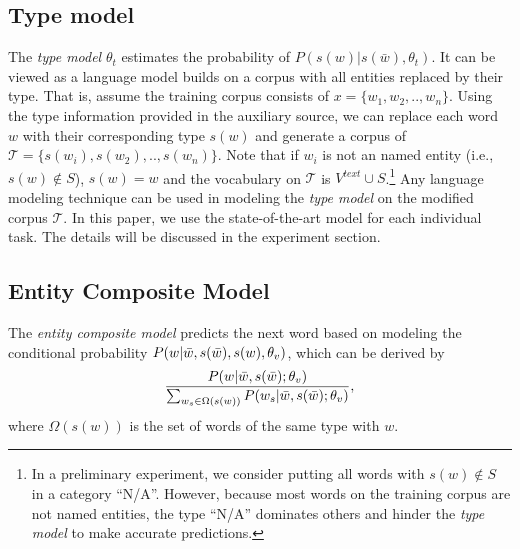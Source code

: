 \documentclass[11pt,a4paper]{article}
\begin{document}
\subsection{ Type model}
\label{type model}

The \textit{ type model} $\theta_t$ estimates the probability of $P(s(w)|s(\bar{w}), \theta_t)$. It can be viewed as a language model builds on a corpus with all entities replaced by their type. That is, assume the training corpus consists of $x = \{ w_1, w_2, .., w_n \}$. Using the type information provided in the auxiliary source, we can replace each word $w$ with their corresponding type $s(w)$ and generate a corpus of $\mathcal{T} = \{ s(w_i), s(w_2), .., s(w_n)\}$. Note that if $w_i$ is not an named entity (i.e., $s(w) \not\in S$), $s(w) = w$ and the vocabulary  on $\mathcal{T}$ is $V^{text} \cup S$.\footnote{In a preliminary experiment, we consider putting all words with $s(w) \not\in S$ in a category ``N/A''. However, because most words on the training corpus are not named entities, the type ``N/A'' dominates others and hinder the \textit{ type model} to make accurate predictions. } Any language modeling technique can be used in modeling the \textit{ type model} on the modified corpus $\mathcal{T}$. In this paper, we use the state-of-the-art model for each individual task. The details will be discussed in the experiment section. 














\subsection{Entity Composite Model}
\label{entity composite model}

The {\it entity composite model} predicts the next word based on modeling the conditional probability 
$P(w|\Bar{w}, s(\bar{w}), s(w), \theta_v)$, which can be derived by
\begin{equation}
\label{eq:7}
\frac{P(w|\Bar{w}, s(\bar{w}); \theta_v)}
{\sum_{w_s\in \Omega(s(w))} P(w_s|\Bar{w}, s(\bar{w}); \theta_v)},
\end{equation}
where $\Omega(s(w))$ is the set of words of the same type with $w$.
\end{document}
